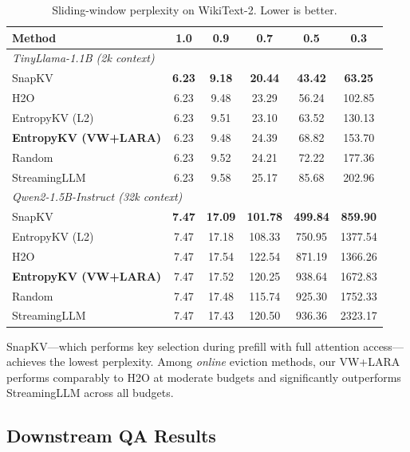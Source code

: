 \documentclass{article}
\begin{document}
\begin{table}[h]
\centering
\caption{Sliding-window perplexity on WikiText-2. Lower is better.}
\label{tab:ppl}
\begin{tabular}{lccccc}
\toprule
\textbf{Method} & \textbf{1.0} & \textbf{0.9} & \textbf{0.7} & \textbf{0.5} & \textbf{0.3} \\
\midrule
\multicolumn{6}{l}{\textit{TinyLlama-1.1B (2k context)}} \\
\midrule
SnapKV & \textbf{6.23} & \textbf{9.18} & \textbf{20.44} & \textbf{43.42} & \textbf{63.25} \\
H2O & 6.23 & 9.48 & 23.29 & 56.24 & 102.85 \\
EntropyKV (L2) & 6.23 & 9.51 & 23.10 & 63.52 & 130.13 \\
\textbf{EntropyKV (VW+LARA)} & 6.23 & 9.48 & 24.39 & 68.82 & 153.70 \\
Random & 6.23 & 9.52 & 24.21 & 72.22 & 177.36 \\
StreamingLLM & 6.23 & 9.58 & 25.17 & 85.68 & 202.96 \\
\midrule
\multicolumn{6}{l}{\textit{Qwen2-1.5B-Instruct (32k context)}} \\
\midrule
SnapKV & \textbf{7.47} & \textbf{17.09} & \textbf{101.78} & \textbf{499.84} & \textbf{859.90} \\
EntropyKV (L2) & 7.47 & 17.18 & 108.33 & 750.95 & 1377.54 \\
H2O & 7.47 & 17.54 & 122.54 & 871.19 & 1366.26 \\
\textbf{EntropyKV (VW+LARA)} & 7.47 & 17.52 & 120.25 & 938.64 & 1672.83 \\
Random & 7.47 & 17.48 & 115.74 & 925.30 & 1752.33 \\
StreamingLLM & 7.47 & 17.43 & 120.50 & 936.36 & 2323.17 \\
\bottomrule
\end{tabular}
\end{table}

SnapKV---which performs key selection during prefill with full attention access---achieves the lowest perplexity. Among \emph{online} eviction methods, our VW+LARA performs comparably to H2O at moderate budgets and significantly outperforms StreamingLLM across all budgets.

\subsection{Downstream QA Results}
\end{document}

